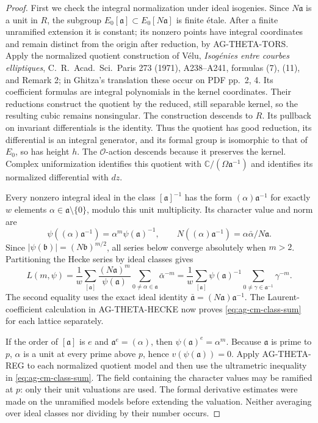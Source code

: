 \documentclass[11pt,a4paper]{article}
\begin{document}
\begin{proof}
First we check the integral normalization under ideal isogenies.
Since $N\mathfrak a$ is a unit in $R$, the subgroup
$E_0[\mathfrak a]\subset E_0[N\mathfrak a]$ is finite
\'etale. After a finite unramified extension it is constant;
its nonzero points have integral coordinates and remain distinct
from the origin after reduction, by AG-THETA-TORS. Apply the
normalized quotient construction of V\'elu, \emph{Isog\'enies
entre courbes elliptiques}, C.~R.~Acad.~Sci.~Paris 273 (1971),
A238--A241, formulas (7), (11), and Remark 2; in Ghitza's
translation these occur on PDF pp.~2, 4. Its coefficient formulas
are integral polynomials in the kernel coordinates. Their reductions
construct the quotient by the reduced, still separable kernel,
so the resulting cubic remains nonsingular. The construction
descends to $R$. Its pullback on invariant differentials is the
identity. Thus the quotient has good reduction, its differential
is an integral generator, and its formal group is isomorphic to
that of $E_0$, so has height $h$. The $\mathcal O$-action descends
because it preserves the kernel. Complex uniformization identifies
this quotient with $\mathbb C/(\Omega\mathfrak a^{-1})$ and
identifies its normalized differential with $dz$.

Every nonzero integral ideal in the class $[\mathfrak a]^{-1}$
has the form $(\alpha)\mathfrak a^{-1}$ for exactly $w$
elements $\alpha\in\mathfrak a\setminus\{0\}$, modulo this
unit multiplicity. Its character value and norm are
\[
 \psi((\alpha)\mathfrak a^{-1})
       =\alpha^m\psi(\mathfrak a)^{-1},\qquad
 N((\alpha)\mathfrak a^{-1})
       =\alpha\bar\alpha/N\mathfrak a.
\]
Since $|\psi(\mathfrak b)|=(N\mathfrak b)^{m/2}$, all series
below converge absolutely when $m>2$. Partitioning the Hecke
series by ideal classes gives
\[
 L(m,\psi)=\frac1w\sum_{[\mathfrak a]}
  \frac{(N\mathfrak a)^m}{\psi(\mathfrak a)}
      \sum_{0\ne\alpha\in\mathfrak a}\bar\alpha^{-m}
 =\frac1w\sum_{[\mathfrak a]}\psi(\mathfrak a)^{-1}
      \sum_{0\ne\gamma\in\mathfrak a^{-1}}\gamma^{-m}.
\]
The second equality uses the exact ideal identity
$\bar{\mathfrak a}=(N\mathfrak a)\mathfrak a^{-1}$.
The Laurent-coefficient calculation in AG-THETA-HECKE now proves
\eqref{eq:ag-cm-class-sum} for each lattice separately.

If the order of $[\mathfrak a]$ is $e$ and
$\mathfrak a^e=(\alpha)$, then
$\psi(\mathfrak a)^e=\alpha^m$. Because $\mathfrak a$ is prime
to $p$, $\alpha$ is a unit at every prime above $p$, hence
$v(\psi(\mathfrak a))=0$. Apply AG-THETA-REG to each normalized
quotient model and then use the ultrametric inequality in
\eqref{eq:ag-cm-class-sum}. The field containing the character
values may be ramified at $p$: only their unit valuations are
used. The formal derivative estimates were made on the unramified
models before extending the valuation. Neither averaging over
ideal classes nor dividing by their number occurs.
\end{proof}
\end{document}
